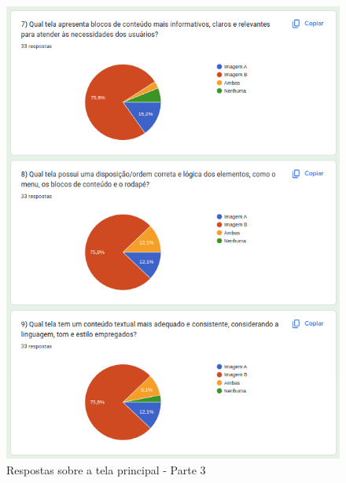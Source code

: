 \begin{figure}[!h]
	\begin{center}
	    \includegraphics[scale=0.7]{figs/Answers/Students/14.png}
	\end{center}
	\caption{\label{APB_TP03}Respostas sobre a tela principal - Parte 3}
\end{figure}

\newpage

